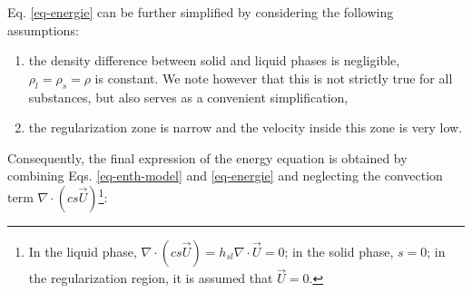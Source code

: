 
\noindent Eq. \ref{eq-energie} can be further simplified by considering the following assumptions: 
\begin{enumerate}[label=(\roman*)]
\item the density difference between solid and liquid phases is negligible, \ie $\rho_l=\rho_s=\rho$ is constant. 
We note however that this is not strictly true for all substances, but also serves as a convenient simplification,
\item the regularization zone is narrow and the velocity inside this zone is very low. 
\end{enumerate}
Consequently, the final expression of the energy equation is obtained by combining Eqs. \ref{eq-enth-model}  and \ref{eq-energie} and  neglecting the convection term $\nabla \cdot ( c s \vec{U})$\footnote{In the liquid phase, $\nabla \cdot ( c s \vec{U})  = h_{sl} \nabla \cdot  \vec{U}=0$; in the solid phase, $s=0$; in the regularization region, it is assumed that $\vec{U}=0.$}:\\

